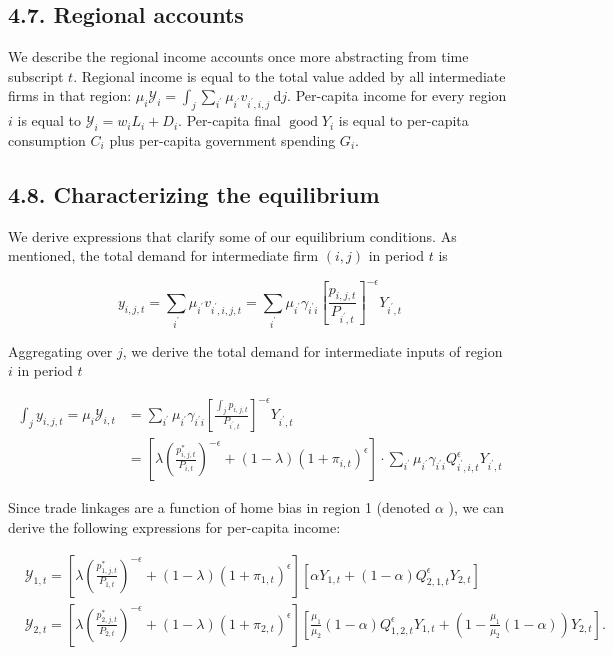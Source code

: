 \documentclass[10pt]{article}
\begin{document}
\subsection*{4.7. Regional accounts}
We describe the regional income accounts once more abstracting from time subscript $t$. Regional income is equal to the total value added by all intermediate firms in that region: $\mu_{i} \mathcal{Y}_{i}= \int_{j} \sum_{i^{\prime}} \mu_{i^{\prime}} v_{i^{\prime}, i, j} \mathrm{~d} j$. Per-capita income for every region $i$ is equal to $\mathcal{Y}_{i}=w_{i} L_{i}+D_{i}$. Per-capita final $\operatorname{good} Y_{i}$ is equal to per-capita consumption $C_{i}$ plus per-capita government spending $G_{i}$.

\subsection*{4.8. Characterizing the equilibrium}
We derive expressions that clarify some of our equilibrium conditions. As mentioned, the total demand for intermediate firm $(i, j)$ in period $t$ is

$$
y_{i, j, t}=\sum_{i^{\prime}} \mu_{i^{\prime}} v_{i^{\prime}, i, j, t}=\sum_{i^{\prime}} \mu_{i^{\prime}} \gamma_{i^{\prime} i}\left[\frac{p_{i, j, t}}{P_{i^{\prime}, t}}\right]^{-\epsilon} Y_{i^{\prime}, t}
$$

Aggregating over $j$, we derive the total demand for intermediate inputs of region $i$ in period $t$


\begin{align*}
\int_{j} y_{i, j, t}=\mu_{i} \mathcal{Y}_{i, t} & =\sum_{i^{\prime}} \mu_{i^{\prime}} \gamma_{i^{\prime} i}\left[\frac{\int_{j} p_{i, j, t}}{P_{i^{\prime}, t}}\right]^{-\epsilon} Y_{i^{\prime}, t}  \tag{4.23}\\
& =\left[\lambda\left(\frac{p_{i, j, t}^{*}}{P_{i, t}}\right)^{-\epsilon}+(1-\lambda)\left(1+\pi_{i, t}\right)^{\epsilon}\right] \cdot \sum_{i^{\prime}} \mu_{i^{\prime}} \gamma_{i^{\prime} i} Q_{i^{\prime}, i, t}^{\epsilon} Y_{i^{\prime}, t} \tag{4.24}
\end{align*}


Since trade linkages are a function of home bias in region 1 (denoted $\alpha$ ), we can derive the following expressions for per-capita income:

$$
\begin{aligned}
& \mathcal{Y}_{1, t}=\left[\lambda\left(\frac{p_{1, j, t}^{*}}{P_{1, t}}\right)^{-\epsilon}+(1-\lambda)\left(1+\pi_{1, t}\right)^{\epsilon}\right]\left[\alpha Y_{1, t}+(1-\alpha) Q_{2,1, t}^{\epsilon} Y_{2, t}\right] \\
& \mathcal{Y}_{2, t}=\left[\lambda\left(\frac{p_{2, j, t}^{*}}{P_{2, t}}\right)^{-\epsilon}+(1-\lambda)\left(1+\pi_{2, t}\right)^{\epsilon}\right]\left[\frac{\mu_{1}}{\mu_{2}}(1-\alpha) Q_{1,2, t}^{\epsilon} Y_{1, t}+\left(1-\frac{\mu_{1}}{\mu_{2}}(1-\alpha)\right) Y_{2, t}\right] .
\end{aligned}
$$
\end{document}
